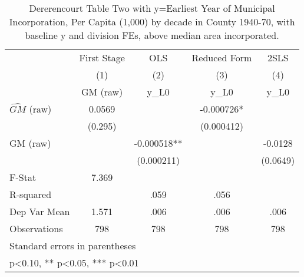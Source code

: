 \begin{table}[htbp]\centering
\def\sym#1{\ifmmode^{#1}\else\(^{#1}\)\fi}
\caption{Dererencourt Table Two with y=Earliest Year of Municipal Incorporation, Per Capita (1,000) by decade in County 1940-70, with baseline y and division FEs, above median area incorporated.}
\begin{tabular}{l*{4}{c}}
\toprule
                    & First Stage   &         OLS   &Reduced Form   &        2SLS   \\
                    &\multicolumn{1}{c}{(1)}&\multicolumn{1}{c}{(2)}&\multicolumn{1}{c}{(3)}&\multicolumn{1}{c}{(4)}\\
                    &\multicolumn{1}{c}{GM  (raw)}&\multicolumn{1}{c}{y\_L0}&\multicolumn{1}{c}{y\_L0}&\multicolumn{1}{c}{y\_L0}\\
\midrule
$\hat{GM}$ (raw)    &      0.0569   &               &   -0.000726*  &               \\
                    &     (0.295)   &               &  (0.000412)   &               \\
\addlinespace
GM  (raw)           &               &   -0.000518** &               &     -0.0128   \\
                    &               &  (0.000211)   &               &    (0.0649)   \\
\midrule
F-Stat              &       7.369   &               &               &               \\
R-squared           &               &        .059   &        .056   &               \\
Dep Var Mean        &       1.571   &        .006   &        .006   &        .006   \\
Observations        &         798   &         798   &         798   &         798   \\
\bottomrule
\multicolumn{5}{l}{\footnotesize Standard errors in parentheses}\\
\multicolumn{5}{l}{\footnotesize * p<0.10, ** p<0.05, *** p<0.01}\\
\end{tabular}
\end{table}
